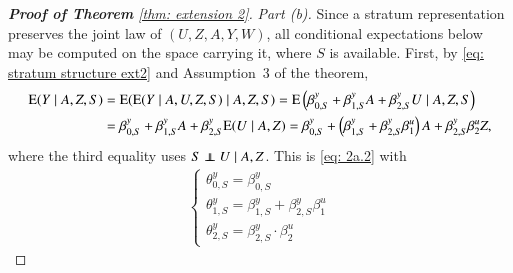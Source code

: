 \begin{proof}[\hypertarget{proof of thm extension 2}{\textbf{Proof of Theorem}} \ref{thm: extension 2}]
\emph{Part (b).} Since a stratum representation preserves the joint law of $(U,Z,A,Y,W)$, all conditional expectations below may be computed on the space carrying it, where $S$ is available. First, by \eqref{eq: stratum structure ext2} and Assumption~3 of the theorem,
\begin{align*}
 \mathrm{E}(Y \mid A, Z, S)&=\mathrm{E}(\mathrm{E}(Y \mid A, U, Z, S) \mid A, Z, S) = \mathrm{E}\left(\beta_{0,S}^y+\beta_{1,S}^y A+\beta_{2,S}^y U \mid A, Z, S\right) \\
&=\beta_{0,S}^y+\beta_{1,S}^y A+\beta_{2,S}^y \mathrm{E}(U \mid A, Z) =\beta_{0,S}^y+\left(\beta_{1,S}^y+\beta_{2, S}^y \beta_1^u\right) A+\beta_{2,S}^y \beta_2^u Z,
\end{align*}
where the third equality uses $S \independent U \mid A,Z$. This is \eqref{eq: 2a.2} with
\begin{align}\label{eq: thetas and betas}
    \left\{\begin{array}{l}
\theta_{0,S}^{y}=\beta_{0,S}^y \\
\theta_{1,S}^{y}=\beta_{1,S}^y+\beta_{2,S}^y \beta_1^u \\
\theta_{2,S}^{y}=\beta_{2,S}^y \cdot \beta_2^u
\end{array}\right.
\end{align}


\end{proof}
